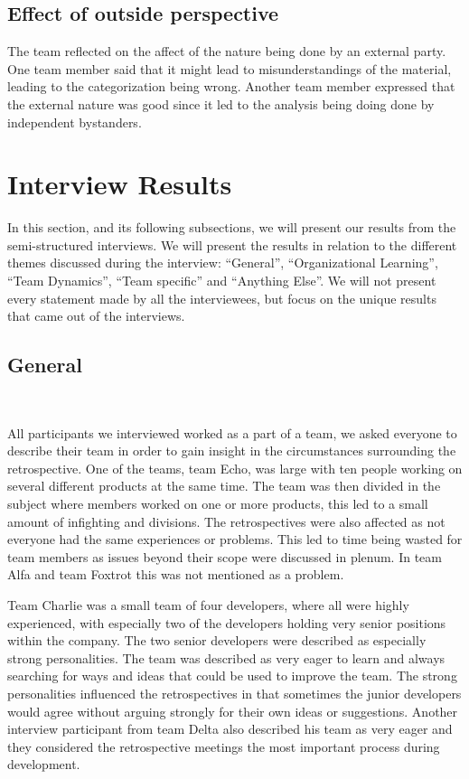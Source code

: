\subsection{Effect of outside perspective}
The team reflected on the affect of the nature being done by an external party. One team member said that it might lead to misunderstandings of the material, leading to the categorization being wrong. Another team member expressed that the external nature was good since it led to the analysis being doing done by independent bystanders.

\clearpage
\section{Interview Results}
In this section, and its following subsections, we will present our results from the semi-structured interviews. We will present the results in relation to the different themes discussed during the interview: ``General'', ``Organizational Learning'', ``Team Dynamics'', ``Team specific'' and ``Anything Else''. We will not present every statement made by all the interviewees, but focus on the unique results that came out of the interviews. 

\subsection{General} %
\label{sub:general}
\

All participants we interviewed worked as a part of a team, we asked everyone to describe their team in order to gain insight in the circumstances surrounding the retrospective.  One of the teams, team Echo, was large with ten people working on several different products at the same time. The team was then divided in the subject where members worked on one or more products, this led to a small amount of infighting and divisions. The retrospectives were also affected as not everyone had the same experiences or problems. This led to time being wasted for team members as issues beyond their scope were discussed in plenum. In team Alfa and team Foxtrot this was not mentioned as a problem. 

Team Charlie was a small team of four developers, where all were highly experienced, with especially two of the developers holding very senior positions within the company. The two senior developers were described as especially strong personalities. The team was described as very eager to learn and always searching for ways and ideas that could be used to improve the team. The strong personalities influenced the retrospectives in that sometimes the junior developers would agree without arguing strongly for their own ideas or suggestions. Another interview participant from team Delta also described his team as very eager and they considered the retrospective meetings the most important process during development. 

